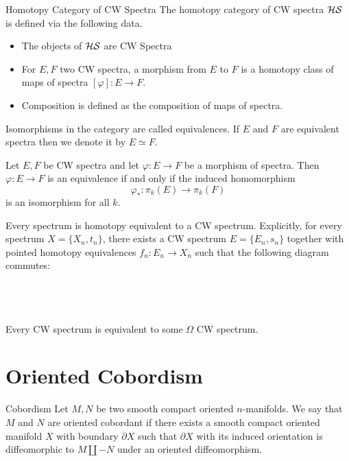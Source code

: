 \documentclass[a4paper]{article}
\begin{document}
\begin{defn}{Homotopy Category of CW Spectra}{} The homotopy category of CW spectra $\mathcal{H}\mathcal{S}$ is defined via the following data. 
\begin{itemize}
\item The objects of $\mathcal{H}\mathcal{S}$ are CW Spectra
\item For $E,F$ two CW spectra, a morphism from $E$ to $F$ is a homotopy class of maps of spectra $[\varphi]:E\to F$. 
\item Composition is defined as the composition of maps of spectra. 
\end{itemize}
Isomorphisms in the category are called equivalences. If $E$ and $F$ are equivalent spectra then we denote it by $E\simeq F$. 
\end{defn}

\begin{thm}{}{} Let $E,F$ be CW spectra and let $\varphi:E\to F$ be a morphism of spectra. Then $\varphi:E\to F$ is an equivalence if and only if the induced homomorphism $$\varphi_\ast:\pi_k(E)\to\pi_k(F)$$ is an isomorphism for all $k$. 
\end{thm}

\begin{thm}{}{} Every spectrum is homotopy equivalent to a CW spectrum. Explicitly, for every spectrum $X=\{X_n,t_n\}$, there exists a CW spectrum $E=\{E_n,s_n\}$ together with pointed homotopy equivalences $f_n:E_n\to X_n$ such that the following diagram commutes: \\~\\
\\~\\
\end{thm}

\begin{thm}{}{} Every CW spectrum is equivalent to some $\Omega$ CW spectrum. 
\end{thm}

\pagebreak
\section{Oriented Cobordism}
\begin{defn}{Cobordism}{} Let $M,N$ be two smooth compact oriented $n$-manifolds. We say that $M$ and $N$ are oriented cobordant if there exists a smooth compact oriented manifold $X$ with boundary $\partial X$ such that $\partial X$ with its induced orientation is diffeomorphic to $M\coprod -N$ under an oriented diffeomorphism. 
\end{defn}
\end{document}
